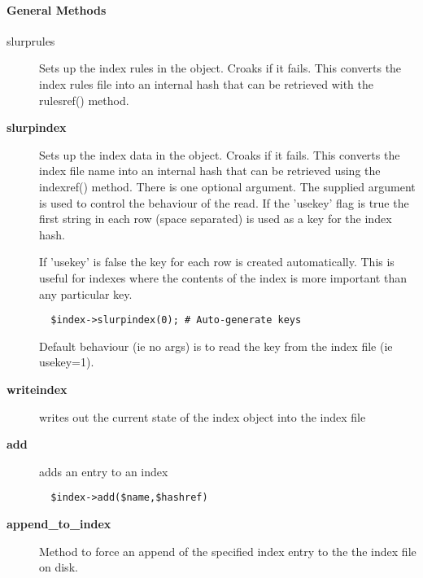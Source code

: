 \paragraph*{General Methods\label{ORAC::Index_General_Methods}}
\begin{description}

\item[{slurprules}] \mbox{}

Sets up the index rules in the object. Croaks if it fails.
This converts the index rules file into an internal hash
that can be retrieved with the rulesref() method.


\item[{\textbf{slurpindex}}] \mbox{}

Sets up the index data in the object. Croaks if it fails.  This
converts the index file name into an internal hash that can be
retrieved using the indexref() method.  There is one optional
argument.  The supplied argument is used to control the behaviour of
the read. If the 'usekey' flag is true the first string in each row
(space separated) is used as a key for the index hash.



If 'usekey' is false the key for each row is created
automatically. This is useful for indexes where the contents
of the index is more important than any particular key.

\begin{verbatim}
  $index->slurpindex(0); # Auto-generate keys
\end{verbatim}


Default behaviour (ie no args) is to read the key from the
index file (ie usekey=1).


\item[{\textbf{writeindex}}] \mbox{}

writes out the current state of the index object into the index file


\item[{\textbf{add}}] \mbox{}

adds an entry to an index

\begin{verbatim}
  $index->add($name,$hashref)
\end{verbatim}

\item[{\textbf{append\_to\_index}}] \mbox{}

Method to force an append of the specified index entry to the
the index file on disk.


\end{description}
